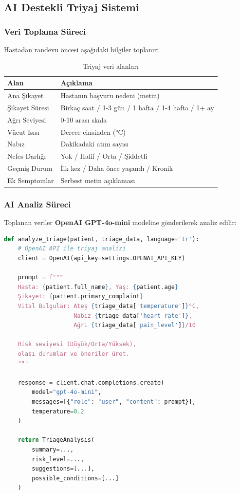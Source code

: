 \documentclass[12pt,a4paper]{article}
\begin{document}
\subsection{AI Destekli Triyaj Sistemi}

\subsubsection{Veri Toplama Süreci}
Hastadan randevu öncesi aşağıdaki bilgiler toplanır:

\begin{table}[h!]
\centering
\begin{tabular}{|l|p{8cm}|}
\hline
\textbf{Alan} & \textbf{Açıklama} \\
\hline
Ana Şikayet & Hastanın başvuru nedeni (metin) \\
\hline
Şikayet Süresi & Birkaç saat / 1-3 gün / 1 hafta / 1-4 hafta / 1+ ay \\
\hline
Ağrı Seviyesi & 0-10 arası skala \\
\hline
Vücut Isısı & Derece cinsinden (°C) \\
\hline
Nabız & Dakikadaki atım sayısı \\
\hline
Nefes Darlığı & Yok / Hafif / Orta / Şiddetli \\
\hline
Geçmiş Durum & İlk kez / Daha önce yaşandı / Kronik \\
\hline
Ek Semptomlar & Serbest metin açıklaması \\
\hline
\end{tabular}
\caption{Triyaj veri alanları}
\end{table}

\subsubsection{AI Analiz Süreci}
Toplanan veriler \textbf{OpenAI GPT-4o-mini} modeline gönderilerek analiz edilir:

\begin{lstlisting}[language=Python, caption=AI Triyaj Analizi]
def analyze_triage(patient, triage_data, language='tr'):
    # OpenAI API ile triyaj analizi
    client = OpenAI(api_key=settings.OPENAI_API_KEY)
    
    prompt = f"""
    Hasta: {patient.full_name}, Yaş: {patient.age}
    Şikayet: {patient.primary_complaint}
    Vital Bulgular: Ateş {triage_data['temperature']}°C, 
                    Nabız {triage_data['heart_rate']}, 
                    Ağrı {triage_data['pain_level']}/10
    
    Risk seviyesi (Düşük/Orta/Yüksek), 
    olası durumlar ve öneriler üret.
    """
    
    response = client.chat.completions.create(
        model="gpt-4o-mini",
        messages=[{"role": "user", "content": prompt}],
        temperature=0.2
    )
    
    return TriageAnalysis(
        summary=...,
        risk_level=...,
        suggestions=[...],
        possible_conditions=[...]
    )
\end{lstlisting}
\end{document}
